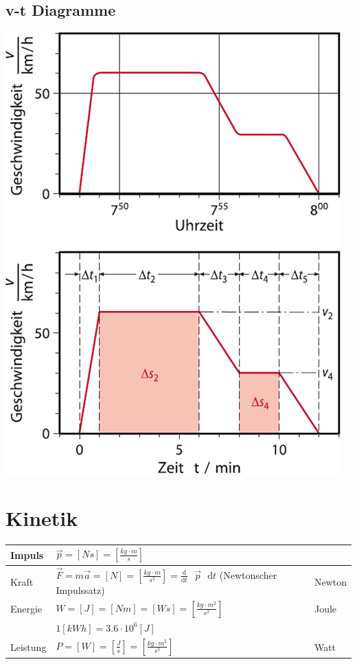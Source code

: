 \documentclass[a4paper]{scrartcl}
\newcommand{\abl}[2]{\frac{\text{d}}{\text{d}#2}\text{ } #1 \text{ }\mathrm{d}t}
\begin{document}
\begin{multicols}{2}
		\subsection{v-t Diagramme}
		\includegraphics[width=0.9\linewidth]{img/v-t_diagram}
	\end{multicols}



\section{Kinetik}
	\begin{tabu} {l X l}
		\hline
		Impuls
		&	$\vec{p} = \left[ Ns \right] = \left[ \frac{kg \cdot m}{s} \right]$	%
		& 
		\\ \hline
		Kraft
		&	$\vec{F}=m\vec{a} = \left[ N \right] = \left[ \frac{kg \cdot m}{s^2} \right] = \abl{\vec{p}}{t}$ (Newtonscher Impulssatz) %
		&	Newton
		\\ \hline
		Energie
		&	$W = \left[ J \right] = \left[ N m \right] = \left[ Ws \right] = \left[ \frac{kg \cdot m^2}{s^2} \right]$
		&	Joule
		\\
		&	$1 \left[kWh\right] = 3.6 \cdot 10^6 \left[ J \right]$
		&
		\\ \hline
		Leistung
		&	$P = \left[ W \right] = \left[ \frac{J}{s} \right] = \left[ \frac{kg \cdot m^2}{s^3} \right]$
		&	Watt
		\\ \hline
	\end{tabu}
	
\end{document}
